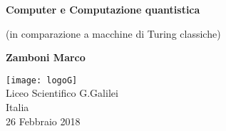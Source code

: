 \begin{titlepage}
    \begin{center}
        \vspace*{1cm}
        
        \Huge
        \textbf{Computer e Computazione quantistica}
        
        \vspace{0.5cm}
		\LARGE        
        (in comparazione a macchine di Turing classiche)
        
        \vspace{1.5cm}
        \huge
        \textbf{Zamboni Marco}
        
        \vfill
        
		\texttt{[image: logoG]}\\		
		\vspace{1.0cm}		
		\Large        
        Liceo Scientifico G.Galilei\\
        Italia\\
        26 Febbraio 2018
        
    \end{center}
\end{titlepage}